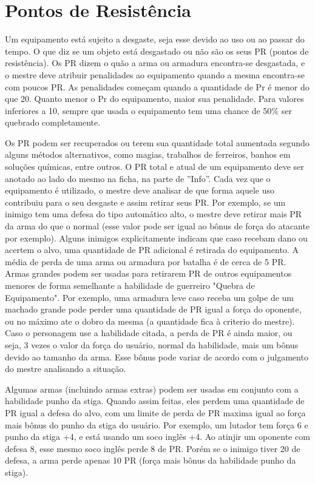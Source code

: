 \section{Pontos de Resistência}

Um equipamento está sujeito a desgaste, seja esse devido ao uso ou ao passar do tempo. O que diz se um objeto está desgastado ou não são os seus PR (pontos de resistência). Os PR dizem o quão a arma ou armadura encontra-se desgastada, e o mestre deve atribuir penalidades ao equipamento quando a mesma encontra-se com poucos PR. As penalidades começam quando a quantidade de Pr é menor do que 20. Quanto menor o Pr do equipamento, maior sua penalidade. Para valores inferiores a 10, sempre que usada o equipamento tem uma chance de 50\% ser quebrado completamente.


Os PR podem ser recuperados ou terem sua quantidade total aumentada segundo alguns métodos alternativos, como magias, trabalhos de ferreiros, banhos em soluções químicas, entre outros. O PR total e atual de um equipamento deve ser anotado ao lado do mesmo na ficha, na parte de ''Info''. Cada vez que o equipamento é utilizado, o mestre deve analisar de que forma aquele uso contribuiu para o seu desgaste e assim retirar seus PR. Por exemplo, se um inimigo tem uma defesa do tipo automático alto, o mestre deve retirar mais PR da arma do que o normal (esse valor pode ser igual ao bônus de força do atacante por exemplo). Alguns inimigos explicitamente indicam que caso recebam dano ou acertem o alvo, uma quantidade de PR adicional é retirada do equipamento. A média de perda de uma arma ou armadura por batalha é de cerca de 5 PR. Armas grandes podem ser usadas para retirarem PR de outros equipamentos menores de forma semelhante a habilidade de guerreiro "Quebra de Equipamento". Por exemplo, uma armadura leve caso receba um golpe de um machado grande pode perder uma quantidade de PR igual a força do oponente, ou no máximo ate o dobro da mesma (a quantidade fica à criterio do mestre). Caso o personagem use a habilidade citada, a perda de PR é ainda maior, ou seja, 3 vezes o valor da força do usuário, normal da habilidade,  mais um bônus devido ao tamanho da arma. Esse bônus pode variar de acordo com o julgamento do mestre analisando a situação.


Algumas armas (incluindo armas extras) podem ser usadas em conjunto com a habilidade punho da stiga. Quando assim feitas, eles perdem uma quantidade de PR igual a defesa do alvo, com um limite de perda de PR maxima igual ao força mais bônus do punho da stiga do usuário. Por exemplo, um lutador tem força 6 e punho da stiga +4, e está usando um soco inglês +4. Ao atinjir um oponente com defesa 8, esse mesmo soco inglês perde 8 de PR. Porém se o inimigo tiver 20 de defesa, a arma perde apenas 10 PR (força mais bônus da habilidade punho da stiga).


